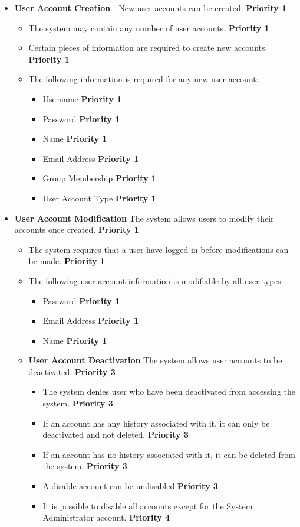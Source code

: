 \documentclass{report}
\begin{document}
\begin{itemize}
\item \textbf{User Account Creation} - New user accounts can be
  created. \textbf{Priority 1}
  \begin{itemize}
  \item The system may contain any number of user
    accounts. \textbf{Priority 1}
  \item Certain pieces of information are required to create new
    accounts. \textbf{Priority 1}
  \item The following information is required for any new user
    account:
    \begin{itemize}
    \item Username \textbf{Priority 1}
    \item Password \textbf{Priority 1}
    \item Name \textbf{Priority 1}
    \item Email Address \textbf{Priority 1}
    \item Group Membership \textbf{Priority 1}
    \item User Account Type \textbf{Priority 1}
    \end{itemize}	
    
  \end{itemize}
\item \textbf{User Account Modification} The system allows users to
  modify their accounts once created. \textbf{Priority 1} 
  \begin{itemize}
  \item The system requires that a user have logged in before
    modifications can be made. \textbf{Priority 1}
  \item The following user account information is modifiable by all
    user types:
    \begin{itemize}
    \item Password \textbf{Priority 1}
    \item Email Address \textbf{Priority 1}
    \item Name \textbf{Priority 1}
    \end{itemize}
    
  \item \textbf{User Account Deactivation} The system allows user
  accounts to be deactivated. \textbf{Priority 3}
  \begin{itemize}
  \item The system denies user who have been deactivated from
    accessing the system. \textbf{Priority 3}
  \item If an account has any history associated with it, it can only
    be deactivated and not deleted. \textbf{Priority 3}
  \item If an account has no history associated with it, it can be
    deleted from the system. \textbf{Priority 3}
  \item A disable account can be undisabled \textbf{Priority 3}
  \item It is possible to disable all accounts except for the System
    Administrator account. \textbf{Priority 4}
  \end{itemize}					
  

\end{itemize}
\end{itemize}
\end{document}

